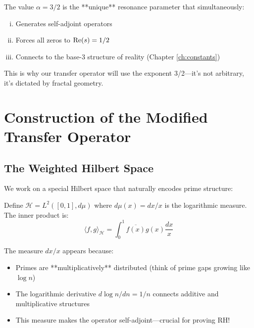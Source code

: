 \begin{theorem}\label{thm:alpha-three-halves}
The value $\alpha = 3/2$ is the **unique** resonance parameter that simultaneously:
\begin{enumerate}[(i)]
\item Generates self-adjoint operators
\item Forces all zeros to $\operatorname{Re}(s) = 1/2$
\item Connects to the base-3 structure of reality (Chapter \ref{ch:constants})
\end{enumerate}
\end{theorem}

This is why our transfer operator will use the exponent 3/2—it's not arbitrary, it's dictated by fractal geometry.

\section{Construction of the Modified Transfer Operator}

\subsection{The Weighted Hilbert Space}

We work on a special Hilbert space that naturally encodes prime structure:

\begin{defn}\label{def:log-hilbert-space}
Define $\mathcal{H} = L^2([0,1], d\mu)$ where $d\mu(x) = dx/x$ is the logarithmic measure. The inner product is:
\begin{equation}
\langle f, g \rangle_{\mathcal{H}} = \int_0^1 \overline{f(x)} g(x) \frac{dx}{x}
\end{equation}
\end{defn}

\begin{intuitive}
The measure $dx/x$ appears because:
\begin{itemize}
\item Primes are **multiplicatively** distributed (think of prime gaps growing like $\log n$)
\item The logarithmic derivative $d\log n / dn = 1/n$ connects additive and multiplicative structures
\item This measure makes the operator self-adjoint—crucial for proving RH!
\end{itemize}
\end{intuitive}

